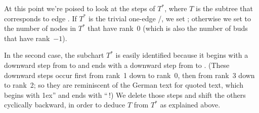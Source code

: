 At this point we're poised to look at the steps of $T^*$, where
$T$ is the subtree that corresponds to edge . If
$T^*$ is the
trivial one-edge \RNBPM/, we set ; otherwise we set  to the
number of nodes in $T^*$ that have rank~0 (which is also the number of buds
that have rank~$-1$).

In the second case, the subchart
$T^*$ is easily identified because it
begins with a downward step from  to 
and ends with a downward step from  to . (These downward
steps occur first from rank~1 down to rank~0, then from rank~3 down
to rank~2; so they are reminiscent of the German text for quoted text,
which begins with \lower1ex\hbox{''} and ends with ``$\,$!)
We delete those steps and shift the others cyclically backward,
in order to deduce $T$ from $T^*$ as explained above.

